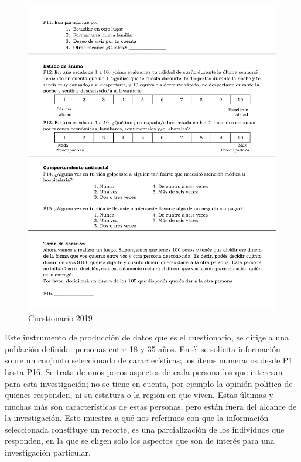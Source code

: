 \documentclass[]{book}
\begin{document}
\begin{figure}

{\centering \includegraphics{imagenes/cuestionario2019_02} 

}

\caption{Cuestionario 2019}\label{fig:cuestionario}
\end{figure}

Este instrumento de producción de datos que es el cuestionario, se dirige a una población definida: personas entre 18 y 35 años. En él se solicita información sobre un conjunto seleccionado de características; los ítems numerados desde P1 hasta P16. Se trata de unos pocos aspectos de cada persona los que interesan para esta investigación; no se tiene en cuenta, por ejemplo la opinión política de quienes responden, ni su estatura o la región en que viven. Estas últimas y muchas más son características de estas personas, pero están fuera del alcance de la investigación. Esto muestra a qué nos referimos con que la información seleccionada constituye un recorte, es una parcialización de los individuos que responden, en la que se eligen solo los aspectos que son de interés para una investigación particular.
\end{document}
